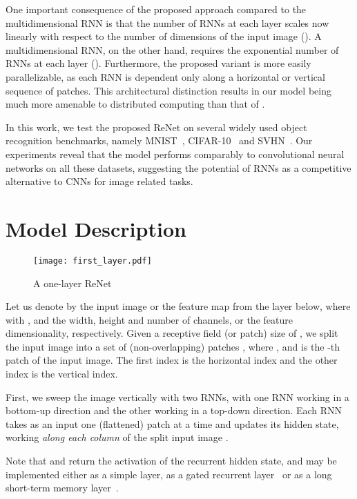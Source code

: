 \documentclass{article} \usepackage{nips15submit_e,times}
\begin{document}
One important consequence of the proposed approach compared to the
multidimensional RNN is that the number of RNNs at each layer scales now linearly
with respect to the number of dimensions  of the input image (). A
multidimensional RNN, on the other hand, requires the exponential number of RNNs
at each layer (). Furthermore, the proposed variant is more easily
parallelizable, as each RNN is dependent only along a horizontal or vertical
sequence of patches. This architectural distinction results in our model being
much more amenable to distributed computing than that of
\citet{Graves+Schmidhuber-2009}. 

In this work, we test the proposed ReNet on several widely used object
recognition benchmarks, namely  MNIST~\citep{Lecun99objectrecognition},
CIFAR-10~\citep{KrizhevskyHinton2009} and SVHN~\citep{Netzer-wkshp-2011}. Our
experiments reveal that the model performs comparably to convolutional neural
networks on all these datasets,
suggesting the potential of RNNs as a competitive alternative to CNNs for image
related tasks.

\section{Model Description}

\begin{wrapfigure}{R}{0.3\textwidth}
    \centering
    \texttt{[image: first\_layer.pdf]}
    \caption{A one-layer ReNet}
    \label{fig:networklayer}
    \vspace{-3mm}
\end{wrapfigure}

Let us denote by  the input image or the feature map 
from the layer below, where  with ,  and 
 the width, height and number of channels, or the feature dimensionality, 
respectively. Given a receptive field (or patch) size of , we 
split the input image  into a set of  (non-overlapping) patches 
, where ,  
and  is the -th patch of the
input image. The first index  is the horizontal index and the other index 
 is the vertical index.

First, we sweep the image vertically with two RNNs, with one RNN working in
a bottom-up direction and the other working in a top-down direction. 
Each RNN takes as an input one (flattened) patch at a time and updates its
hidden state, working \emph{along each column}  of the split input image .


Note that  and  return the activation of the
recurrent hidden state, and may be implemented either as a simple  layer,
as a gated recurrent layer~\citep{Cho2014} or as a long short-term memory
layer~\citep{Hochreiter+Schmidhuber-1997}.
\end{document}
